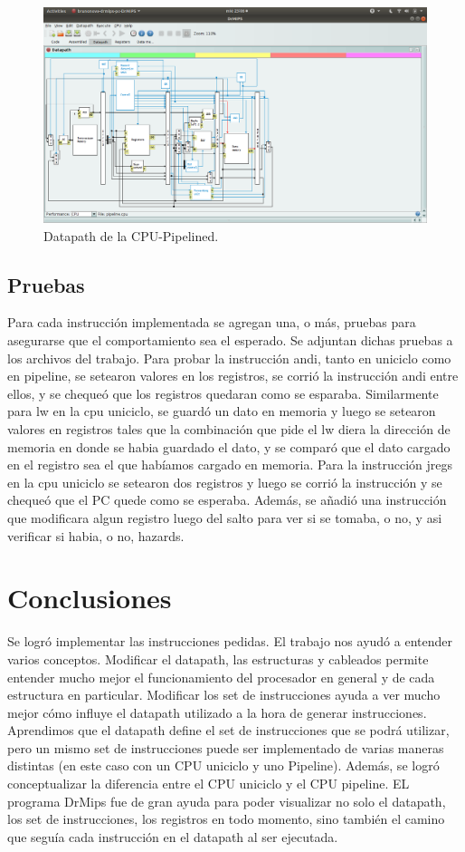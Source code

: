 \documentclass[a4paper, 12pt]{article}
\begin{document}
		\begin{figure}[!h]
	  		\centering
			    \includegraphics[width=\textwidth]{files/cpupipelined.png}
		 	 \caption{Datapath de la CPU-Pipelined.}
	  		\label{fig}
		\end{figure}	
	
	\subsection{Pruebas}
	Para cada instrucción implementada se agregan una, o más, pruebas para asegurarse que el comportamiento sea el esperado. Se adjuntan dichas pruebas a los archivos del trabajo.
	Para probar la instrucción andi, tanto en uniciclo como en pipeline, se setearon valores en los registros, se corrió la instrucción andi entre ellos, y se chequeó que los registros quedaran como se esparaba. 
	Similarmente para lw en la cpu uniciclo, se guardó un dato en memoria y luego se setearon valores en registros tales que la combinación que pide el lw diera la dirección de memoria en donde se habia guardado el dato, y se comparó que el dato cargado en el registro sea el que habíamos cargado en memoria.
	Para la instrucción jregs en la cpu uniciclo se setearon dos registros y luego se corrió la instrucción y se chequeó que el PC quede como se esperaba. Además, se añadió una instrucción que modificara algun registro luego del salto para ver si se tomaba, o no, y asi verificar si habia, o no, hazards.
	
	\section{Conclusiones}
	Se logró implementar las instrucciones pedidas.
	El trabajo nos ayudó a entender varios conceptos. Modificar el datapath, las estructuras y cableados permite entender mucho mejor el funcionamiento del procesador en general y de cada estructura en particular. Modificar los set de instrucciones ayuda a ver mucho mejor cómo influye el datapath utilizado a la hora de generar instrucciones. Aprendimos que el datapath define el set de instrucciones que se podrá utilizar, pero un mismo set de instrucciones puede ser implementado de varias maneras distintas (en este caso con un CPU uniciclo y uno Pipeline). Además, se logró conceptualizar la diferencia entre el CPU uniciclo y el CPU pipeline.
	EL programa DrMips fue de gran ayuda para poder visualizar no solo el datapath, los set de instrucciones, los registros en todo momento, sino también el camino que seguía cada instrucción en el datapath al ser ejecutada.
\end{document}
